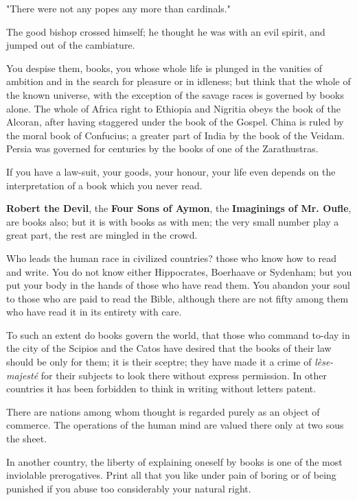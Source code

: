 "There were not any popes any more than cardinals."

The good bishop crossed himself; he thought he was with an evil spirit,
and jumped out of the cambiature.






You despise them, books, you whose whole life is plunged in the vanities
of ambition and in the search for pleasure or in idleness; but think
that the whole of the known universe, with the exception of the savage
races is governed by books alone. The whole of Africa right to Ethiopia
and Nigritia obeys the book of the Alcoran, after having staggered under
the book of the Gospel. China is ruled by the moral book of Confucius; a
greater part of India by the book of the Veidam. Persia was governed for
centuries by the books of one of the Zarathustras.

If you have a law-suit, your goods, your honour, your life even depends
on the interpretation of a book which you never read.

\textbf{Robert the Devil}, the \textbf{Four Sons of Aymon}, the \textbf{Imaginings of Mr.
Oufle}, are books also; but it is with books as with men; the very small
number play a great part, the rest are mingled in the crowd.

Who leads the human race in civilized countries? those who know how to
read and write. You do not know either Hippocrates, Boerhaave or
Sydenham; but you put your body in the hands of those who have read
them. You abandon your soul to those who are paid to read the Bible,
although there are not fifty among them who have read it in its entirety
with care.

To such an extent do books govern the world, that those who command
to-day in the city of the Scipios and the Catos have desired that the
books of their law should be only for them; it is their sceptre; they
have made it a crime of \textit{lèse-majesté} for their subjects to look there
without express permission. In other countries it has been forbidden to
think in writing without letters patent.

There are nations among whom thought is regarded purely as an object of
commerce. The operations of the human mind are valued there only at two
sous the sheet.

In another country, the liberty of explaining oneself by books is one of
the most inviolable prerogatives. Print all that you like under pain of
boring or of being punished if you abuse too considerably your natural
right.

